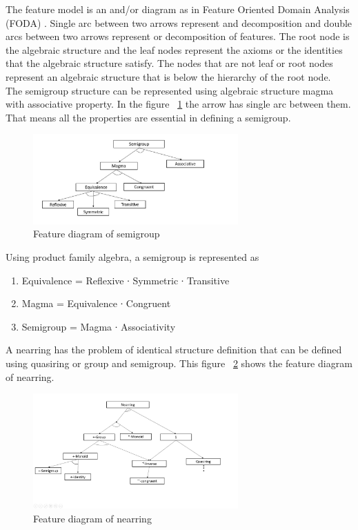 The feature model is an and/or diagram as in Feature Oriented Domain Analysis
(FODA) \cite{kang1990feature}. Single arc between two arrows represent and
decomposition and double arcs between two arrows represent or decomposition of
features. The root node is the algebraic structure and the leaf nodes represent
the axioms or the identities that the algebraic structure satisfy. The nodes
that are not leaf or root nodes represent an algebraic structure that is below
the hierarchy of the root node. \\

The semigroup structure can be represented using algebraic structure magma with
associative property. In the figure ~\ref{fig_multienv_1} the arrow has single
arc between them. That means all the properties are essential in defining a
semigroup.
\begin{figure}[ht]
	\centering
	\includegraphics[width=0.7\textwidth]{figures/Sample/semigroupPFA.jpg}
	\caption{Feature diagram of semigroup}
	\label{fig_multienv_1}
\end{figure}

Using product family algebra, a semigroup is represented as 
\begin{enumerate}
\item Equivalence = Reflexive ∙ Symmetric ∙ Transitive
\item Magma = Equivalence ∙ Congruent
\item Semigroup = Magma ∙ Associativity 
\end{enumerate}
A nearring has the problem of identical structure definition that can be defined
using quasiring or group and semigroup. This figure ~\ref{fig_nearring} shows
the feature diagram of nearring. 
 \begin{figure}[ht]
	\centering		
	\includegraphics[width=0.7\textwidth]{figures/Sample/nearringPFA.jpg}
	\caption{Feature diagram of nearring}
	\label{fig_nearring}
\end{figure}

